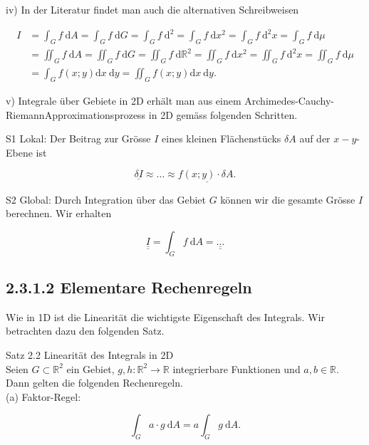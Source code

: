 \documentclass[10pt]{article}
\begin{document}
iv) In der Literatur findet man auch die alternativen Schreibweisen


\begin{align*}
I & =\int_{G} f \mathrm{~d} A=\int_{G} f \mathrm{~d} G=\int_{G} f \mathrm{~d}^{2}=\int_{G} f \mathrm{~d} x^{2}=\int_{G} f \mathrm{~d}^{2} x=\int_{G} f \mathrm{~d} \mu \\
& =\iint_{G} f \mathrm{~d} A=\iint_{G} f \mathrm{~d} G=\iint_{G} f \mathrm{~d} \mathbb{R}^{2}=\iint_{G} f \mathrm{~d} x^{2}=\iint_{G} f \mathrm{~d}^{2} x=\iint_{G} f \mathrm{~d} \mu \\
& =\int_{G} f(x ; y) \mathrm{d} x \mathrm{~d} y=\iint_{G} f(x ; y) \mathrm{d} x \mathrm{~d} y . \tag{2.66}
\end{align*}


v) Integrale über Gebiete in 2D erhält man aus einem Archimedes-Cauchy-RiemannApproximationsprozess in 2D gemäss folgenden Schritten.

S1 Lokal: Der Beitrag zur Grösse $I$ eines kleinen Flächenstücks $\delta A$ auf der $x-y$-Ebene ist


\begin{equation*}
\underline{\delta I} \approx \ldots \approx \underline{f(x ; y) \cdot \delta A .} \tag{2.67}
\end{equation*}


S2 Global: Durch Integration über das Gebiet $G$ können wir die gesamte Grösse $I$ berechnen. Wir erhalten


\begin{equation*}
\underline{\underline{I}}=\int_{G} f \mathrm{~d} A=\underline{\underline{\ldots}} \tag{2.68}
\end{equation*}


\subsection*{2.3.1.2 Elementare Rechenregeln}
Wie in 1D ist die Linearität die wichtigste Eigenschaft des Integrals. Wir betrachten dazu den folgenden Satz.

Satz 2.2 Linearität des Integrals in 2D\\
Seien $G \subset \mathbb{R}^{2}$ ein Gebiet, $g, h: \mathbb{R}^{2} \rightarrow \mathbb{R}$ integrierbare Funktionen und $a, b \in \mathbb{R}$. Dann gelten die folgenden Rechenregeln.\\
(a) Faktor-Regel:


\begin{equation*}
\int_{G} a \cdot g \mathrm{~d} A=a \int_{G} g \mathrm{~d} A . \tag{2.69}
\end{equation*}
\end{document}
